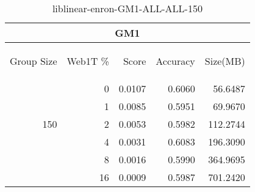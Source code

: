 \begin{center}
\begin{table}[htbp] 
 \begin{center}
\begin{tabular}{ | r | r | r | r | r |}
\hline
\multicolumn{5}{|c|}{GM1}\\
\hline
\begin{sideways}Group Size\end{sideways} & \begin{sideways}Web1T \%\end{sideways} & \begin{sideways}Score\end{sideways} & \begin{sideways}Accuracy\end{sideways} & \begin{sideways}Size(MB)\end{sideways}\\
\hline
\multirow{5}{*}{150}
 & 0 & 0.0107 & 0.6060 & 56.6487\\ \cline{2-5}
 & 1 & 0.0085 & 0.5951 & 69.9670\\ \cline{2-5}
 & 2 & 0.0053 & 0.5982 & 112.2744\\ \cline{2-5}
 & 4 & 0.0031 & 0.6083 & 196.3090\\ \cline{2-5}
 & 8 & 0.0016 & 0.5990 & 364.9695\\ \cline{2-5}
 & 16 & 0.0009 & 0.5987 & 701.2420\\ \cline{2-5}
\hline
\end{tabular}
\caption{liblinear-enron-GM1-ALL-ALL-150}
\label{table:liblinear-enron-GM1-ALL-ALL-150}
\end{center}
 \end{table}
\end{center}

